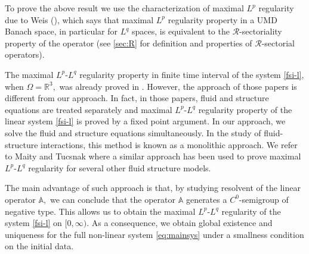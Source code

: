 \documentclass[12pt,a4paper,reqno]{amsart}
\theoremstyle{definition}
\theoremstyle{remark}
\numberwithin{equation}{section}
\newcommand{\mr}{\mathcal{R}}
\begin{document}
To prove the above result we use  the  characterization of maximal $L^{p}$ regularity  due to Weis (\cite[Theorem 4.2]{Weis01}), which says that maximal $L^{p}$ regularity property in a UMD Banach space, in particular for $L^{q}$ spaces,  is equivalent to the $\mr$-sectoriality property of the operator (see \cref{sec:R} for definition and properties of $\mr$-sectorial operators).

The maximal $L^{p}$-$L^{q}$ regularity property in finite time interval of the system \eqref{fsi-l}, when $\Omega = \mathbb{R}^{3},$ was already proved in  \cite{Gei13,Got12}.  However, the approach of those papers is different from our approach. In fact, in those papers, fluid and structure equations are treated separately and maximal $L^{p}$-$L^{q}$ regularity property of the linear system \eqref{fsi-l} is proved by a fixed point argument.  In our approach, we solve the fluid and structure equations simultaneously. In the study of fluid-structure interactions, this method is known as a monolithic approach. We refer to Maity and Tucsnak \cite{MT17} where a similar approach has been used to prove maximal $L^{p}$-$L^{q}$ regularity for several other fluid structure models.



The main advantage of such approach is that, by studying resolvent of the  linear operator $\mathbb{A},$ we can conclude that the operator $\mathbb{A}$ generates a $C^{0}$-semigroup of negative type. This allows us to obtain the  maximal $L^{p}$-$L^{q}$ regularity of the  system  \eqref{fsi-l} on $[0,\infty).$  As a consequence, we obtain global existence and uniqueness  for the full non-linear system \eqref{eq:mainsys} under a smallness condition on the initial data.
\end{document}
